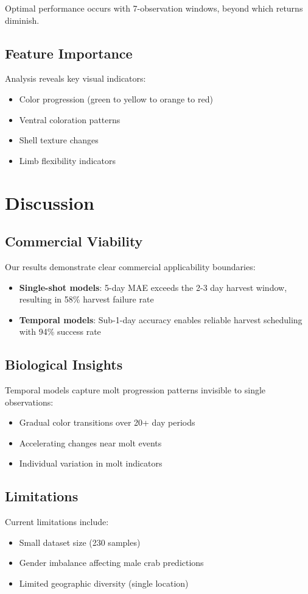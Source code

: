\documentclass[10pt,twocolumn,letterpaper]{article}
\begin{document}
Optimal performance occurs with 7-observation windows, beyond which returns diminish.

\subsection{Feature Importance}
Analysis reveals key visual indicators:
\begin{itemize}
\item Color progression (green to yellow to orange to red)
\item Ventral coloration patterns
\item Shell texture changes
\item Limb flexibility indicators
\end{itemize}

\section{Discussion}

\subsection{Commercial Viability}
Our results demonstrate clear commercial applicability boundaries:
\begin{itemize}
\item \textbf{Single-shot models}: 5-day MAE exceeds the 2-3 day harvest window, resulting in 58\% harvest failure rate
\item \textbf{Temporal models}: Sub-1-day accuracy enables reliable harvest scheduling with 94\% success rate
\end{itemize}

\subsection{Biological Insights}
Temporal models capture molt progression patterns invisible to single observations:
\begin{itemize}
\item Gradual color transitions over 20+ day periods
\item Accelerating changes near molt events
\item Individual variation in molt indicators
\end{itemize}

\subsection{Limitations}
Current limitations include:
\begin{itemize}
\item Small dataset size (230 samples)
\item Gender imbalance affecting male crab predictions
\item Limited geographic diversity (single location)
\end{itemize}
\end{document}
